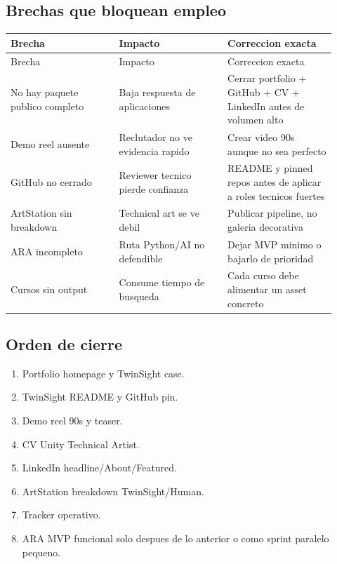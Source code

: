 \subsection{Brechas que bloquean empleo}


\begin{center}
\scriptsize
\begin{longtable}{>{\raggedright\arraybackslash}p{0.305\linewidth} >{\raggedright\arraybackslash}p{0.305\linewidth} >{\raggedright\arraybackslash}p{0.305\linewidth}}
\toprule
Brecha & Impacto & Correccion exacta \\
\midrule
\endfirsthead
\toprule
Brecha & Impacto & Correccion exacta \\
\midrule
\endhead
No hay paquete publico completo & Baja respuesta de aplicaciones & Cerrar portfolio + GitHub + CV + LinkedIn antes de volumen alto \\
Demo reel ausente & Reclutador no ve evidencia rapido & Crear video 90s aunque no sea perfecto \\
GitHub no cerrado & Reviewer tecnico pierde confianza & README y pinned repos antes de aplicar a roles tecnicos fuertes \\
ArtStation sin breakdown & Technical art se ve debil & Publicar pipeline, no galeria decorativa \\
ARA incompleto & Ruta Python/AI no defendible & Dejar MVP minimo o bajarlo de prioridad \\
Cursos sin output & Consume tiempo de busqueda & Cada curso debe alimentar un asset concreto \\
\bottomrule
\end{longtable}
\end{center}



\subsection{Orden de cierre}


\begin{enumerate}
\item Portfolio homepage y TwinSight case.
\item TwinSight README y GitHub pin.
\item Demo reel 90s y teaser.
\item CV Unity Technical Artist.
\item LinkedIn headline/About/Featured.
\item ArtStation breakdown TwinSight/Human.
\item Tracker operativo.
\item ARA MVP funcional solo despues de lo anterior o como sprint paralelo pequeno.
\end{enumerate}


